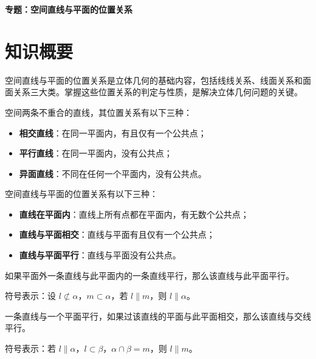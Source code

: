 \documentclass[11pt]{ctexrep}
\begin{document}
\begin{center}
    {\LARGE\bfseries 专题：空间直线与平面的位置关系}
\end{center}

\section*{知识概要}

空间直线与平面的位置关系是立体几何的基础内容，包括线线关系、线面关系和面面关系三大类。掌握这些位置关系的判定与性质，是解决立体几何问题的关键。

\begin{definition}[空间两直线的位置关系]
    空间两条不重合的直线，其位置关系有以下三种：
    \begin{itemize}
        \item \textbf{相交直线}：在同一平面内，有且仅有一个公共点；
        \item \textbf{平行直线}：在同一平面内，没有公共点；
        \item \textbf{异面直线}：不同在任何一个平面内，没有公共点。
    \end{itemize}
\end{definition}

\begin{definition}[直线与平面的位置关系]
    空间直线与平面的位置关系有以下三种：
    \begin{itemize}
        \item \textbf{直线在平面内}：直线上所有点都在平面内，有无数个公共点；
        \item \textbf{直线与平面相交}：直线与平面有且仅有一个公共点；
        \item \textbf{直线与平面平行}：直线与平面没有公共点。
    \end{itemize}
\end{definition}

\begin{property}[线面平行的判定定理]
    如果平面外一条直线与此平面内的一条直线平行，那么该直线与此平面平行。
    
    符号表示：设 $l \not\subset \alpha$，$m \subset \alpha$，若 $l \parallel m$，则 $l \parallel \alpha$。
\end{property}

\begin{property}[线面平行的性质定理]
    一条直线与一个平面平行，如果过该直线的平面与此平面相交，那么该直线与交线平行。
    
    符号表示：若 $l \parallel \alpha$，$l \subset \beta$，$\alpha \cap \beta = m$，则 $l \parallel m$。
\end{property}
\end{document}
